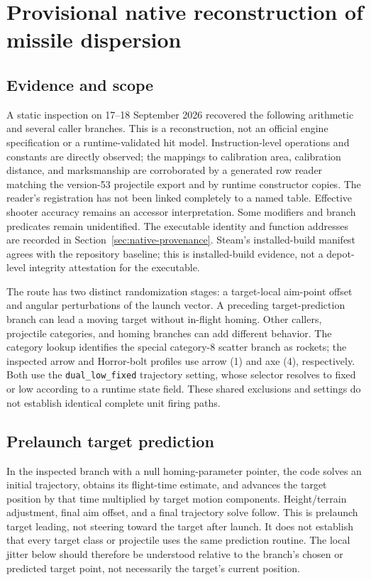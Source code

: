 \documentclass[11pt]{article}
\begin{document}
\section{Provisional native reconstruction of missile dispersion}
\label{sec:native-dispersion}

\subsection{Evidence and scope}

A static inspection on 17--18 September 2026 recovered the following arithmetic
and several caller branches.  This is a reconstruction, not an official
engine specification or a runtime-validated hit model.  Instruction-level
operations and constants are directly observed; the mappings to calibration
area, calibration distance, and marksmanship are corroborated by a generated
row reader matching the version-53 projectile export and by runtime constructor
copies.  The reader's registration has not been linked completely to a named
table.  Effective shooter accuracy remains an accessor interpretation.
Some modifiers and branch predicates
remain unidentified.  The executable identity and function addresses are
recorded in Section~\ref{sec:native-provenance}.  Steam's installed-build
manifest agrees with the repository baseline; this is installed-build
evidence, not a depot-level integrity attestation for the executable.

The route has two distinct randomization stages: a target-local aim-point
offset and angular perturbations of the launch vector.  A preceding
target-prediction branch can lead a moving target without in-flight homing.
Other callers,
projectile categories, and homing branches can add different behavior.
The category lookup identifies the special category-8 scatter branch as
rockets; the inspected arrow and Horror-bolt profiles use arrow (1) and axe
(4), respectively.  Both use the \texttt{dual\_low\_fixed} trajectory setting,
whose selector resolves to fixed or low according to a runtime state field.
These shared exclusions and settings do not establish identical complete
unit firing paths.

\subsection{Prelaunch target prediction}

In the inspected branch with a null homing-parameter pointer, the code
solves an initial trajectory, obtains its flight-time estimate, and advances
the target position by that time multiplied by target motion components.
Height/terrain adjustment, final aim offset, and a final trajectory solve
follow.  This is prelaunch target leading, not steering toward the target
after launch.  It does not establish that every target class or projectile
uses the same prediction routine.  The local jitter below should therefore
be understood relative to the branch's chosen or predicted target point,
not necessarily the target's current position.
\end{document}
